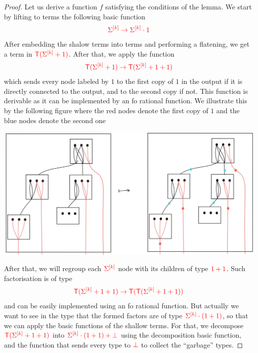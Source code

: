 \begin{proof}
Let us derive a function $f$ satisfying the conditions of the lemma. We start by lifting to terms the following basic function 
\begin{align*}
{\color{red}{\Sigma^{{\color{red}{[k]}}}  \to \Sigma^{{\color{red}{[k]}}} \cdot1}}
\end{align*}
After embedding the shalow terms into terms and performing a flatening, we get a term in ${\color{red}{{\color{red}{\mathsf T}}(\Sigma^{{\color{red}{[k]}}}+1)}}$. After that, we apply the function
\begin{align*}
{\color{red}{{\color{red}{\mathsf T}}(\Sigma^{{\color{red}{[k]}}}+1)\to {\color{red}{\mathsf T}}(\Sigma^{{\color{red}{[k]}}}+1+1)}}
\end{align*}
which sends every node labeled by $1$ to the first copy of $1$ in the output if it is directly connected to the output, and to the second copy if not. This function is derivable as it can be implemented by an fo rational function. We illustrate this by the following figure where the red nodes denote the first copy of $1$ and the blue nodes denote the second one
\begin{center}
\includegraphics[scale=.1]{MyPicLabel1.jpg}
\end{center}  
After that, we will regroup each ${\color{red}{\Sigma^{{\color{red}{[k]}}}}}$ node with its children of type ${\color{red}{1+1}}$. Such factorisation is of type
\begin{align*}
{\color{red}{{\color{red}{\mathsf T}}(\Sigma^{{\color{red}{[k]}}}+1+1)\to {\color{red}{\mathsf T}}({\color{red}{\mathsf T}}(\Sigma^{{\color{red}{[k]}}}+1+1))}}
\end{align*} 
and can be easily implemented using an fo rational function.
But actually we want to see in the type that the formed factors are of type ${\color{red}{\Sigma^{{\color{red}{[k]}}}\cdot(1+1)}}$, so that we can apply the basic functions of the shallow terms. For that, we decompose ${\color{red}{{\color{red}{\mathsf T}}(\Sigma^{{\color{red}{[k]}}}+1+1)}}$ into ${\color{red}{\Sigma^{{\color{red}{[k]}}}\cdot(1+1)+\bot}}$ using the decomposition basic function, and the function 
that sends every type to ${\color{red}{\bot}}$ to collect the ``garbage'' types.

\end{proof}
